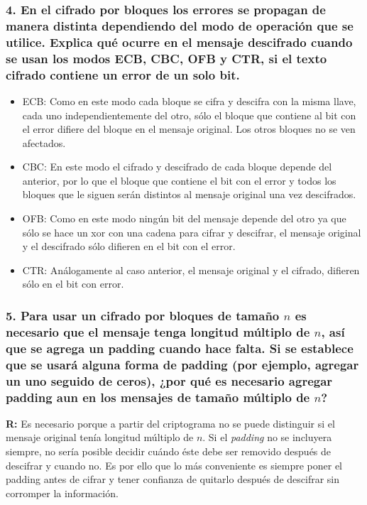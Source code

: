 \documentclass[12pt]{article}
\begin{document}
\subsubsection*{4. En el cifrado por bloques los errores se propagan de manera distinta dependiendo del modo de operación que se utilice. Explica qué ocurre en el mensaje descifrado cuando se usan los modos ECB, CBC, OFB y CTR, si el texto cifrado contiene un error de un solo bit.}
\begin{itemize}
\item ECB: Como en este modo cada bloque se cifra y descifra con la misma llave, cada uno independientemente del otro, sólo el bloque que contiene al bit con el error difiere del bloque en el mensaje original. Los otros bloques no se ven afectados.
\item CBC: En este modo el cifrado y descifrado de cada bloque depende del anterior, por lo que el bloque que contiene el bit con el error y todos los bloques que le siguen serán distintos al mensaje original una vez descifrados.
\item OFB: Como en este modo ningún bit del mensaje depende del otro ya que sólo se hace un xor con una cadena para cifrar y descifrar, el mensaje original y el descifrado sólo difieren en el bit con el error.
\item CTR: Análogamente al caso anterior, el mensaje original y el cifrado, difieren sólo en el bit con error.
\end{itemize}

\subsubsection*{5. Para usar un cifrado por bloques de tamaño $n$ es necesario que el mensaje tenga longitud múltiplo de $n$, así que se agrega un padding cuando hace falta. Si se establece que se usará alguna forma de padding (por ejemplo, agregar un uno seguido de ceros), ¿por qué es necesario agregar padding aun en los mensajes de tamaño múltiplo de $n$?}
 \textbf{R:} Es necesario porque a partir del criptograma no se puede distinguir si el mensaje original tenía longitud múltiplo de $n$. Si el \textit{padding} no se incluyera siempre, no sería posible decidir cuándo éste debe ser removido después de descifrar y cuando no. Es por ello que lo más conveniente es siempre poner el padding antes de cifrar y tener confianza de quitarlo después de descifrar sin corromper la información.
\end{document}
